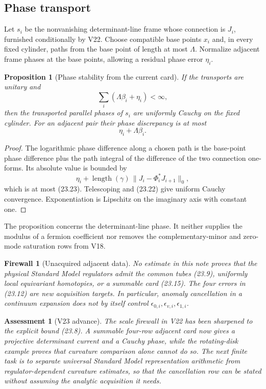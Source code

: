 \documentclass[11pt]{article}
\newtheorem{proposition}[theorem]{Proposition}
\newtheorem{assessment}[theorem]{Assessment}
\newtheorem{firewall}[theorem]{Firewall}
\begin{document}
\subsection{Phase transport}

Let \(s_i\) be the nonvanishing determinant-line frame whose connection
is \(J_i\), furnished conditionally by V22.  Choose compatible base
points \(x_i\) and, in every fixed cylinder, paths from the base point of
length at most \(\Lambda\).  Normalize adjacent frame phases at the base
points, allowing a residual phase error \(\eta_i\).

\begin{proposition}[Phase stability from the current card]
\label{prop:v11v23-phase-stability}
If the transports are unitary and
\[
 \sum_i(\Lambda\beta_i+\eta_i)<\infty,
 \tag{23.22}
\]
then the transported parallel phases of \(s_i\) are uniformly Cauchy on
the fixed cylinder.  For an adjacent pair their phase discrepancy is at
most
\[
 \eta_i+\Lambda\beta_i.
 \tag{23.23}
\]
\end{proposition}

\begin{proof}
The logarithmic phase difference along a chosen path is the base-point
phase difference plus the path integral of the difference of the two
connection one-forms.  Its absolute value is bounded by
\[
 \eta_i+\operatorname{length}(\gamma)\,
 \|J_i-\Phi_i^*J_{i+1}\|_0,
\]
which is at most (23.23).  Telescoping and (23.22) give uniform Cauchy
convergence.  Exponentiation is Lipschitz on the imaginary axis with
constant one.
\end{proof}

The proposition concerns the determinant-line phase.  It neither supplies
the modulus of a fermion coefficient nor removes the complementary-minor
and zero-mode saturation rows from V18.

\begin{firewall}[Unacquired adjacent data]
\label{fw:v11v23-unacquired}
No estimate in this note proves that the physical Standard Model
regulators admit the common tubes (23.9), uniformly local equivariant
homotopies, or a summable card (23.15).  The four errors in (23.12) are
new acquisition targets.  In particular, anomaly cancellation in a
continuum expansion does not by itself control
\(\epsilon_{0,i},\epsilon_{v,i},\epsilon_{1,i}\).
\end{firewall}

\begin{assessment}[V23 advance]
\label{ass:v11v23}
The scale firewall in V22 has been sharpened to the explicit bound
(23.8).  A summable four-row adjacent card now gives a projective
determinant current and a Cauchy phase, while the rotating-disk example
proves that curvature comparison alone cannot do so.  The next finite
task is to separate universal Standard Model representation arithmetic
from regulator-dependent curvature estimates, so that the cancellation
row can be stated without assuming the analytic acquisition it needs.
\end{assessment}
\end{document}
